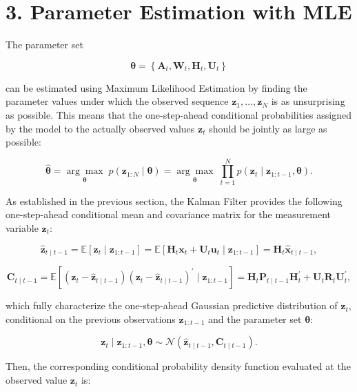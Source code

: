 \documentclass[11pt]{article}
\newcommand{\trans}{^{\prime}}
\begin{document}
\section*{3. Parameter Estimation with MLE}

The parameter set

\[
\boldsymbol{\theta}
=
\left\{
\mathbf{A}_t,
\mathbf{W}_t,
\mathbf{H}_t,
\mathbf{U}_t
\right\}
\]

can be estimated using Maximum Likelihood Estimation by finding the parameter values under which the observed sequence $\mathbf{z}_1,\ldots,\mathbf{z}_N$ is as unsurprising as possible. This means that the one-step-ahead conditional probabilities assigned by the model to the actually observed values $\mathbf{z}_t$ should be jointly as large as possible:

\[
\widehat{\boldsymbol{\theta}}
=
\underset{\boldsymbol{\theta}}{\arg\max}
\;
p\!\left(
\mathbf{z}_{1:N}
\mid
\boldsymbol{\theta}
\right)
=
\underset{\boldsymbol{\theta}}{\arg\max}
\;
\prod_{t=1}^{N}
p\!\left(
\mathbf{z}_t
\mid
\mathbf{z}_{1:t-1},
\boldsymbol{\theta}
\right).
\]

As established in the previous section, the Kalman Filter provides the following one-step-ahead conditional mean and covariance matrix for the measurement variable $\mathbf{z}_t$:

\[
\widehat{\mathbf{z}}_{t\mid t-1}
=
\mathbb{E}\!\left[
\mathbf{z}_t
\mid
\mathbf{z}_{1:t-1}
\right]
=
\mathbb{E}\!\left[
\mathbf{H}_t\mathbf{x}_t
+
\mathbf{U}_t\mathbf{u}_t
\mid
\mathbf{z}_{1:t-1}
\right]
=
\mathbf{H}_t
\widehat{\mathbf{x}}_{t\mid t-1},
\]

\[
\mathbf{C}_{t\mid t-1}
=
\mathbb{E}\!\left[
\left(
\mathbf{z}_t-\widehat{\mathbf{z}}_{t\mid t-1}
\right)
\left(
\mathbf{z}_t-\widehat{\mathbf{z}}_{t\mid t-1}
\right)\trans
\mid
\mathbf{z}_{1:t-1}
\right]
=
\mathbf{H}_t
\mathbf{P}_{t\mid t-1}
\mathbf{H}_t\trans
+
\mathbf{U}_t
\mathbf{R}_t
\mathbf{U}_t\trans,
\]

which fully characterize the one-step-ahead Gaussian predictive distribution of $\mathbf{z}_t$, conditional on the previous observations $\mathbf{z}_{1:t-1}$ and the parameter set $\boldsymbol{\theta}$:

\[
\mathbf{z}_t
\mid
\mathbf{z}_{1:t-1},
\boldsymbol{\theta}
\sim
\mathcal{N}\!\left(
\widehat{\mathbf{z}}_{t\mid t-1},
\mathbf{C}_{t\mid t-1}
\right).
\]

Then, the corresponding conditional probability density function evaluated at the observed value $\mathbf{z}_t$ is:
\end{document}
